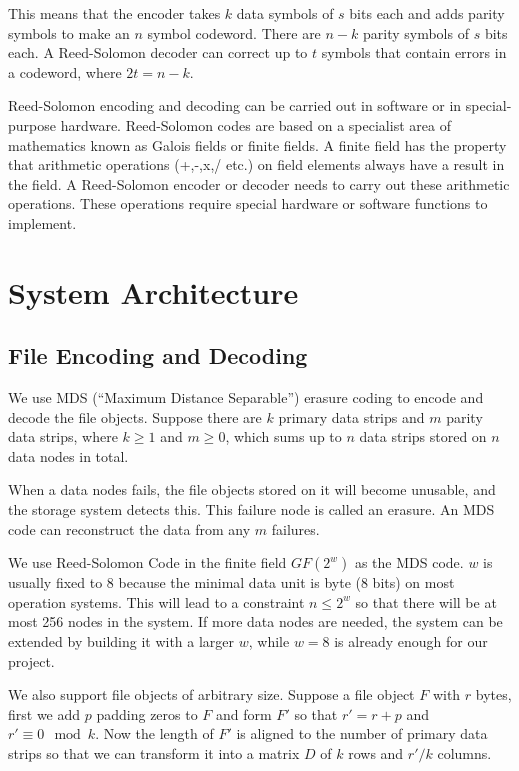 \documentclass[conference]{IEEEtran}
\begin{document}
This means that the encoder takes $k$ data symbols of $s$ bits each and adds parity symbols to make an $n$ symbol codeword. There are $n-k$ parity symbols of $s$ bits each. A Reed-Solomon decoder can correct up to $t$ symbols that contain errors in a codeword, where $2t = n-k$.

Reed-Solomon encoding and decoding can be carried out in software or in special-purpose hardware. Reed-Solomon codes are based on a specialist area of mathematics known as Galois fields or finite fields. A finite field has the property that arithmetic operations (+,-,x,/ etc.) on field elements always have a result in the field. A Reed-Solomon encoder or decoder needs to carry out these arithmetic operations. These operations require special hardware or software functions to implement.


\section{System Architecture}

\subsection{File Encoding and Decoding}

We use MDS (``Maximum Distance Separable'') erasure coding to encode and decode the file objects. Suppose there are $k$ primary data strips and $m$ parity data strips, where $k\geqslant 1$ and $m\geqslant 0$, which sums up to $n$ data strips stored on $n$ data nodes in total. 

When a data nodes fails, the file objects stored on it will become unusable,
and the storage system detects this. This failure node is called an erasure. An MDS code can reconstruct the data from any $m$ failures. 

We use Reed-Solomon Code in the finite field $GF(2^w)$ as the MDS code. $w$ is usually fixed to 8 because the minimal data unit is byte (8 bits) on most operation systems. This will lead to a constraint $n\leqslant 2^w$ so that there will be at most 256 nodes in the system. If more data nodes are needed, the system can be extended by building it with a larger $w$, while $w=8$ is already enough for our project. 

We also support file objects of arbitrary size. Suppose a file object $F$ with $r$ bytes, first we add $p$ padding zeros to $F$ and form $F'$ so that $r'=r+p$ and $r' \equiv 0 \mod k$. Now the length of $F'$ is aligned to the number of primary data strips so that we can transform it into a matrix $D$ of $k$ rows and $r'/k$ columns. 
\end{document}
